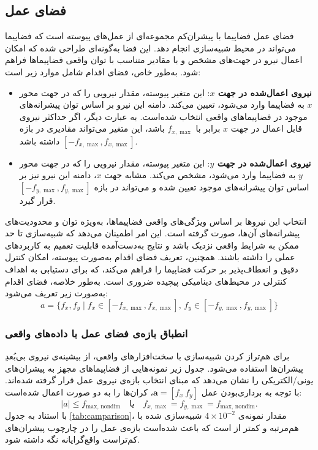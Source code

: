 \subsection{فضای عمل }



فضای عمل 
فضاپیما با پیشران‌کم
مجموعه‌ای از عمل‌های پیوسته است که فضاپیما می‌تواند در محیط شبیه‌سازی انجام دهد. این فضا به‌گونه‌ای طراحی شده که امکان اعمال نیرو در جهت‌های مشخص و با مقادیر متناسب با توان واقعی فضاپیماها فراهم شود. به‌طور خاص، فضای اقدام شامل موارد زیر است:

\begin{itemize}
	\item \textbf{نیروی اعمال‌شده در جهت \( x \)}: این متغیر پیوسته، مقدار نیرویی را که در جهت محور \( x \) به فضاپیما وارد می‌شود، تعیین می‌کند. دامنه این نیرو بر اساس توان پیشرانه‌های موجود در فضاپیماهای واقعی انتخاب شده‌است. به عبارت دیگر، اگر حداکثر نیروی قابل اعمال در جهت \( x \) برابر با \( f_{x,\max} \) باشد، این متغیر می‌تواند مقادیری در بازه \( [-f_{x,\max}, f_{x,\max}] \) داشته باشد.
	
	\item \textbf{نیروی اعمال‌شده در جهت \( y \)}: این متغیر پیوسته، مقدار نیرویی را که در جهت محور \( y \) به فضاپیما وارد می‌شود، مشخص می‌کند. مشابه جهت \( x \)، دامنه این نیرو نیز بر اساس توان پیشرانه‌های موجود تعیین شده و می‌تواند در بازه \( [-f_{y,\max}, f_{y,\max}] \) قرار گیرد.
\end{itemize}

انتخاب این نیروها بر اساس ویژگی‌های واقعی فضاپیماها، به‌ویژه توان و محدودیت‌های پیشرانه‌های آن‌ها، صورت گرفته است. این امر اطمینان می‌دهد که شبیه‌سازی تا حد ممکن به شرایط واقعی نزدیک باشد و نتایج به‌دست‌آمده قابلیت تعمیم به کاربردهای عملی را داشته باشند. همچنین، تعریف فضای اقدام به‌صورت پیوسته، امکان کنترل دقیق و انعطاف‌پذیر بر حرکت فضاپیما را فراهم می‌کند، که برای دستیابی به اهداف کنترلی در محیط‌های دینامیکی پیچیده ضروری است.
به‌طور خلاصه، فضای اقدام به‌صورت زیر تعریف می‌شود:
\[
a = \{ f_x, f_y \mid f_x \in [-f_{x,\max}, f_{x,\max}], \, f_y \in [-f_{y,\max}, f_{y,\max}] \}
\]

\subsubsection*{انطباق بازه‌ی فضای عمل با داده‌های واقعی}
برای هم‌تراز کردن شبیه‌سازی با سخت‌افزارهای واقعی، از بیشینه‌ی نیروی بی‌بُعدِ پیشران‌ها استفاده می‌شود. جدول زیر نمونه‌هایی از فضاپیماهای مجهز به پیشران‌های یونی/الکتریکی را نشان می‌دهد که مبنای انتخاب بازه‌ی نیروی عمل قرار گرفته شده‌اند. با توجه به برداری‌بودن عمل
$\boldsymbol{a}=[
f_x ~  f_y
]$،
کران‌ها را به دو صورت اعمال شده‌است:
\[
|a| \le f_{\text{max, nondim}}
\quad \text{یا} \quad
f_{x,\max}=f_{y,\max}=f_{\text{max, nondim}}.
\]
با استناد به جدول
\ref{tab:camparison}،
مقدار نمونه‌ی \(4{\times}10^{-2}\) شبیه‌سازی شده با  هم‌مرتبه و کمتر از  است که باعث شده‌است بازه‌ی عمل را در چارچوب پیشران‌های کم‌تراست واقع‌گرایانه نگه داشته شود.


